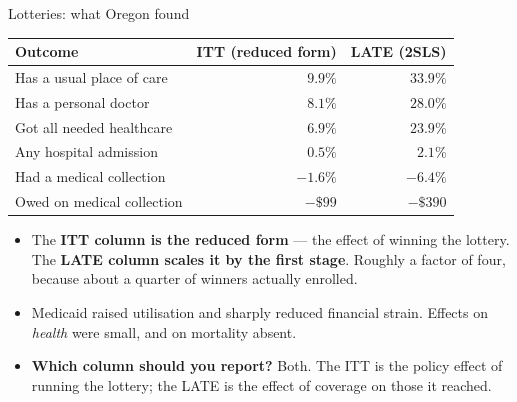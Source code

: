 \documentclass[
  11pt,
  ignorenonframetext,
  aspectratio=169,
]{beamer}
\providecommand{\tightlist}{%
  \setlength{\itemsep}{0pt}\setlength{\parskip}{0pt}}
\begin{document}
\begin{frame}{Lotteries: what Oregon found}
\protect{}\label{lotteries-what-oregon-found}
\begin{center}
\small
\begin{tabular}{lrr}
\toprule
Outcome & ITT (reduced form) & LATE (2SLS) \\
\midrule
Has a usual place of care      & $9.9\%$  & $33.9\%$ \\
Has a personal doctor          & $8.1\%$  & $28.0\%$ \\
Got all needed healthcare      & $6.9\%$  & $23.9\%$ \\
Any hospital admission         & $0.5\%$  & $2.1\%$  \\
Had a medical collection       & $-1.6\%$ & $-6.4\%$ \\
Owed on medical collection     & $-\$99$  & $-\$390$ \\
\bottomrule
\end{tabular}
\end{center}

\begin{itemize}
\tightlist
\item
  The \textbf{ITT column is the reduced form} --- the effect of winning
  the lottery. The \textbf{LATE column scales it by the first stage}.
  Roughly a factor of four, because about a quarter of winners actually
  enrolled.
\item
  Medicaid raised utilisation and sharply reduced financial strain.
  Effects on \emph{health} were small, and on mortality absent.
\item
  \textbf{Which column should you report?} Both. The ITT is the policy
  effect of running the lottery; the LATE is the effect of coverage on
  those it reached.
\end{itemize}
\end{frame}
\end{document}
